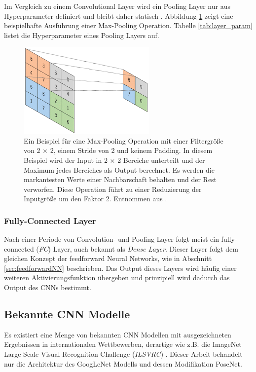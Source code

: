  Im Vergleich zu einem Convolutional Layer wird ein Pooling Layer nur aus Hyperparameter definiert und bleibt daher statisch \cite{yamashitaConvolutionalNeuralNetworks2018}. Abbildung \ref{fig:pooling_layer} zeigt eine beispielhafte Ausführung einer Max-Pooling Operation. Tabelle \ref{tab:layer_param} listet die Hyperparameter eines Pooling Layers auf.
 \vspace*{1cm}
 \begin{figure}[H]
	\centering
	\includegraphics[width=0.6\textwidth]{images/ann_conv/max_pool.png}
	\caption{Ein Beispiel für eine Max-Pooling Operation mit einer Filtergröße von 2 $\times$ 2, einem Stride von 2 und keinem Padding. In diesem Beispiel wird der Input in 2 $\times$ 2 Bereiche unterteilt und der Maximum jedes Bereiches als Output berechnet. Es werden die markantesten Werte einer Nachbarschaft behalten und der Rest verworfen. Diese Operation führt zu einer Reduzierung der Inputgröße um den Faktor 2. Entnommen aus \cite{yamashitaConvolutionalNeuralNetworks2018}.}
	\label{fig:pooling_layer}
\end{figure}



\subsubsection{Fully-Connected Layer}
Nach einer Periode von Convolution- und Pooling Layer folgt meist ein fully-connected (\textit{FC}) Layer, auch bekannt als \textit{Dense Layer}. Dieser Layer folgt dem gleichen Konzept der feedforward Neural Networks, wie in Abschnitt \ref{sec:feedforwardNN} beschrieben. Das Output dieses Layers wird häufig einer weiteren Aktivierungsfunktion übergeben \cite{yamashitaConvolutionalNeuralNetworks2018} und prinzipiell wird dadurch das Output des CNNs bestimmt.

\subsection{Bekannte CNN Modelle}
Es existiert eine Menge von bekannten CNN Modellen mit ausgezeichneten Ergebnissen in internationalen Wettbewerben, derartige wie z.B. die ImageNet Large Scale Visual Recognition Challenge (\textit{ILSVRC}) \cite{russakovskyImageNetLargeScale2015}. Dieser Arbeit behandelt nur die Architektur des GoogLeNet Modells und dessen Modifikation PoseNet.


